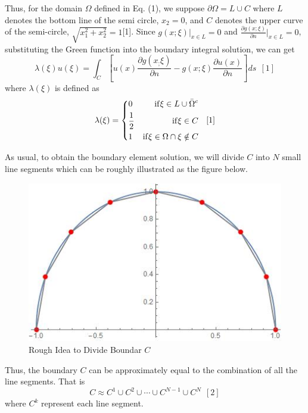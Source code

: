 \documentclass[a4paper,12pt]{article}
\begin{document}
\par Thus, for the domain $\Omega$ defined in Eq. (1), we suppose $\partial \Omega = L \cup C$ where $L$ denotes the bottom line of the semi circle, $x_2 = 0$, and $C$ denotes the upper curve of the semi-circle, $\sqrt{x_1^2 + x_2^2} = 1$[1]. Since $g(x;\xi)|_{x \in L} = 0$ and $\frac{\partial g(x;\xi)}{\partial n}|_{x \in L} = 0$, substituting the Green function into the boundary integral solution, we can get 
\begin{equation}
\lambda(\xi)u(\xi) = \int_{C} [u(x)\frac{\partial g(x_;\xi)}{\partial n} - g(x;\xi) \frac{\partial u(x)}{\partial n}] ds \ \ [1] 
\end{equation}
where $\lambda (\xi)$ is defined as
\begin{equation}
\lambda(\xi) = \left\{
\begin{aligned}
&0 &{\rm if} \xi \in L \cup \bar{\Omega}^c\\
&\frac{1}{2} &{\rm if} \xi \in C\\
&1 &{\rm if} \xi \in \Omega \cap \xi \notin C\\
\end{aligned} 
\right. \ \ [1]
\end{equation}


\par As usual, to obtain the boundary element solution, we will divide $C$ into $N$ small line segments which can be roughly illustrated as the figure below.

\begin{figure}[H]
\centering
\includegraphics[scale=0.6]{segments2.jpg}
\caption{Rough Idea to Divide Boundar $C$}
\end{figure}
\noindent Thus, the boundary $C$ can be approximately equal to the combination of all the line segments. That is
\begin{equation}
C \approx C^1 \cup C^2 \cup \cdots \cup C^{N-1} \cup C^N \ \ [2]
\end{equation} 
where $C^k$ represent each line segment. 
\end{document}
